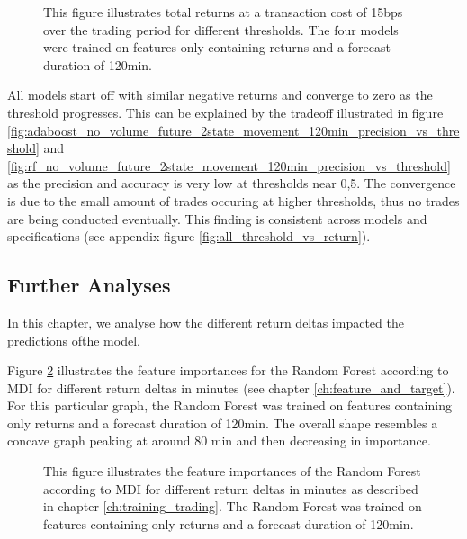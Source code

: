 \begin{figure}[H]
    \captionsetup{format=plain}
    \caption{ 
            This figure illustrates total returns at a transaction cost of 15bps over the trading period for different thresholds.
            The four models were trained on features only containing returns and a forecast duration of 120min.
        }
    \label{fig:all_threshold_vs_return_15bps_no_volume_120min}
\end{figure}

All models start off with similar negative returns and converge to zero as the threshold progresses. 
This can be explained by the tradeoff illustrated in figure 
\ref{fig:adaboost_no_volume_future_2state_movement_120min_precision_vs_threshold} and \ref{fig:rf_no_volume_future_2state_movement_120min_precision_vs_threshold}
as the precision and accuracy is very low at thresholds near 0,5. 
The convergence is due to the small amount of trades occuring at higher thresholds, thus no trades are being conducted eventually.
This finding is consistent across models and specifications (see appendix figure \ref{fig:all_threshold_vs_return}).




\subsection{Further Analyses}
In this chapter, we analyse how the different return deltas impacted the predictions ofthe model.

Figure \ref{fig:forest_return_feature_importance_no_volume_120min} illustrates the feature importances for the Random Forest according to MDI \cite{louppe2015variableImportance}
for different return deltas in minutes (see chapter \ref{ch:feature_and_target}). 
For this particular graph, the Random Forest was trained on features containing only returns and a forecast duration of 120min.   
The overall shape resembles a concave graph peaking at around 80 min and then decreasing in importance.

\begin{figure}[H]
    \captionsetup{format=plain}
    \caption{ 
            This figure illustrates the feature importances of the Random Forest according to MDI \cite{louppe2015variableImportance}
            for different return deltas in minutes as described in chapter \ref{ch:training_trading}. 
            The Random Forest was trained on features containing only returns and a forecast duration of 120min.   
        }
    \label{fig:forest_return_feature_importance_no_volume_120min}
\end{figure}

